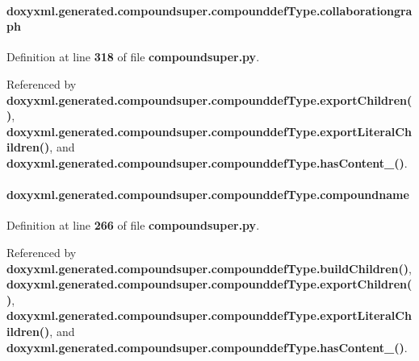 \paragraph[{collaborationgraph}]{\setlength{\rightskip}{0pt plus 5cm}doxyxml.\+generated.\+compoundsuper.\+compounddef\+Type.\+collaborationgraph}\label{classdoxyxml_1_1generated_1_1compoundsuper_1_1compounddefType_af0f02862c02c393b531f2b7d66d7448c}


Definition at line {\bf 318} of file {\bf compoundsuper.\+py}.



Referenced by {\bf doxyxml.\+generated.\+compoundsuper.\+compounddef\+Type.\+export\+Children()}, {\bf doxyxml.\+generated.\+compoundsuper.\+compounddef\+Type.\+export\+Literal\+Children()}, and {\bf doxyxml.\+generated.\+compoundsuper.\+compounddef\+Type.\+has\+Content\+\_\+()}.

\paragraph[{compoundname}]{\setlength{\rightskip}{0pt plus 5cm}doxyxml.\+generated.\+compoundsuper.\+compounddef\+Type.\+compoundname}\label{classdoxyxml_1_1generated_1_1compoundsuper_1_1compounddefType_acf6c1b56d74b19c1839a95b46dbee746}


Definition at line {\bf 266} of file {\bf compoundsuper.\+py}.



Referenced by {\bf doxyxml.\+generated.\+compoundsuper.\+compounddef\+Type.\+build\+Children()}, {\bf doxyxml.\+generated.\+compoundsuper.\+compounddef\+Type.\+export\+Children()}, {\bf doxyxml.\+generated.\+compoundsuper.\+compounddef\+Type.\+export\+Literal\+Children()}, and {\bf doxyxml.\+generated.\+compoundsuper.\+compounddef\+Type.\+has\+Content\+\_\+()}.

